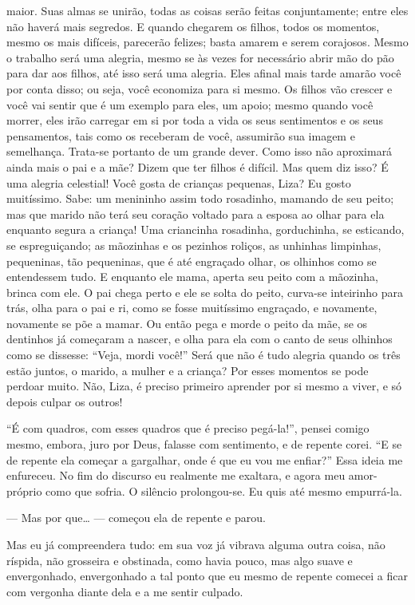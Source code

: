 maior. Suas almas se unirão, todas as coisas serão feitas
conjuntamente; entre eles não haverá mais segredos. E quando chegarem
os filhos, todos os momentos, mesmo os mais difíceis, parecerão
felizes; basta amarem e serem corajosos. Mesmo o trabalho será uma
alegria, mesmo se às vezes for necessário abrir mão do pão para dar aos
filhos, até isso será uma alegria. Eles afinal mais tarde amarão você
por conta disso; ou seja, você economiza para si mesmo. Os filhos vão
crescer e você vai sentir que é um exemplo para eles, um apoio; mesmo
quando você morrer, eles irão carregar em si por toda a vida os seus
sentimentos e os seus pensamentos, tais como os receberam de você,
assumirão sua imagem e semelhança. Trata-se portanto de um grande
dever. Como isso não aproximará ainda mais o pai e a mãe? Dizem que ter
filhos é difícil. Mas quem diz isso? É uma alegria celestial! Você
gosta de crianças pequenas, Liza? Eu gosto muitíssimo. Sabe: um
menininho assim todo rosadinho, mamando de seu peito; mas que marido
não terá seu coração voltado para a esposa ao olhar para ela enquanto
segura a criança! Uma criancinha rosadinha, gorduchinha, se esticando,
se espreguiçando; as mãozinhas e os pezinhos roliços, as unhinhas
limpinhas, pequeninas, tão pequeninas, que é até engraçado olhar, os
olhinhos como se entendessem tudo. E enquanto ele mama, aperta seu
peito com a mãozinha, brinca com ele. O pai chega perto e ele se solta
do peito, curva-se inteirinho para trás, olha para o pai e ri, como se
fosse muitíssimo engraçado, e novamente, novamente se põe a mamar. Ou
então pega e morde o peito da mãe, se os dentinhos já começaram a
nascer, e olha para ela com o canto de seus olhinhos como se dissesse:
“Veja, mordi você!” Será que não é tudo alegria quando os três estão
juntos, o marido, a mulher e a criança? Por esses momentos se pode
perdoar muito. Não, Liza, é preciso primeiro aprender por si mesmo a
viver, e só depois culpar os outros!

“É com quadros, com esses quadros que é preciso pegá-la!”, pensei comigo
mesmo, embora, juro por Deus, falasse com sentimento, e de repente
corei. “E se de repente ela começar a gargalhar, onde é que eu vou me
enfiar?” Essa ideia me enfureceu. No fim do discurso eu realmente me
exaltara, e agora meu amor-próprio como que sofria. O silêncio
prolongou-se. Eu quis até mesmo empurrá-la.

--- Mas por que\ldots{} --- começou ela de repente e parou.

Mas eu já compreendera tudo: em sua voz já vibrava alguma outra coisa,
não ríspida, não grosseira e obstinada, como havia pouco, mas algo
suave e envergonhado, envergonhado a tal ponto que eu mesmo de repente
comecei a ficar com vergonha diante dela e a me sentir culpado.

